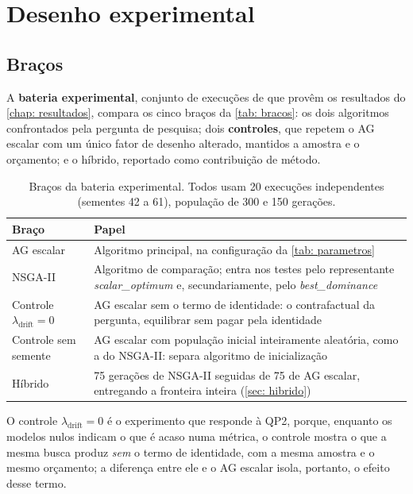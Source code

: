 \section{Desenho experimental}
\label{sec: desenho}

\subsection{Braços}
\label{sub: bracos}

A \textbf{bateria experimental}, conjunto de execuções de que provêm os resultados do \autoref{chap: resultados}, compara os cinco braços da \autoref{tab: bracos}: os dois algoritmos confrontados pela pergunta de pesquisa; dois \textbf{controles}, que repetem o AG escalar com um único fator de desenho alterado, mantidos a amostra e o orçamento; e o híbrido, reportado como contribuição de método.

\begin{table}[htb]
    \caption[Braços da bateria experimental]{Braços da bateria experimental. Todos usam 20 execuções independentes (sementes 42 a 61), população de 300 e 150 gerações.}
    \label{tab: bracos}
    \centering
    \small
    \begin{tabularx}{\textwidth}{l X}
        \toprule
        \textbf{Braço} & \textbf{Papel} \\
        \midrule
        AG escalar & Algoritmo principal, na configuração da \autoref{tab: parametros} \\
        NSGA-II & Algoritmo de comparação; entra nos testes pelo representante \textit{scalar\_optimum} e, secundariamente, pelo \textit{best\_dominance} \\
        Controle $\lambda_{\mathrm{drift}} = 0$ & AG escalar sem o termo de identidade: o contrafactual da pergunta, equilibrar sem pagar pela identidade \\
        Controle sem semente & AG escalar com população inicial inteiramente aleatória, como a do NSGA-II: separa algoritmo de inicialização \\
        Híbrido & 75 gerações de NSGA-II seguidas de 75 de AG escalar, entregando a fronteira inteira (\autoref{sec: hibrido}) \\
        \bottomrule
    \end{tabularx}
    \source
\end{table}

O controle $\lambda_{\mathrm{drift}} = 0$ é o experimento que responde à QP2, porque, enquanto os modelos nulos indicam o que é acaso numa métrica, o controle mostra o que a mesma busca produz \textit{sem} o termo de identidade, com a mesma amostra e o mesmo orçamento; a diferença entre ele e o AG escalar isola, portanto, o efeito desse termo.

